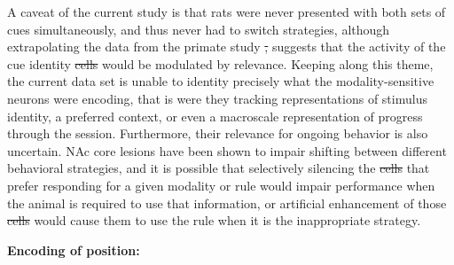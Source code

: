 \documentclass[11pt]{article}
\providecommand{\DIFadd}[1]{{\protect\color{blue}\uwave{#1}}} %
\providecommand{\DIFdel}[1]{{\protect\color{red}\sout{#1}}}                      %
\providecommand{\DIFaddbegin}{} %
\providecommand{\DIFaddend}{} %
\providecommand{\DIFdelbegin}{} %
\providecommand{\DIFdelend}{} %
\newcommand{\DIFscaledelfig}{0.5}
\newlength{\DIFdelgraphicswidth} %
\newlength{\DIFdelgraphicsheight} %
\newcommand{\DIFaddincludegraphics}[2][]{{\color{blue}\fbox{\DIFOincludegraphics[#1]{#2}}}} %
\newcommand{\DIFdelincludegraphics}[2][]{%
\sbox{\DIFdelgraphicsbox}{\DIFOincludegraphics[#1]{#2}}%
\settoboxwidth{\DIFdelgraphicswidth}{\DIFdelgraphicsbox} %
\settoboxtotalheight{\DIFdelgraphicsheight}{\DIFdelgraphicsbox} %
\scalebox{\DIFscaledelfig}{%
\parbox[b]{\DIFdelgraphicswidth}{\usebox{\DIFdelgraphicsbox}\\[-\baselineskip] \rule{\DIFdelgraphicswidth}{0em}}\llap{\resizebox{\DIFdelgraphicswidth}{\DIFdelgraphicsheight}{%
\setlength{\unitlength}{\DIFdelgraphicswidth}%
\begin{picture}(1,1)%
\thicklines\linethickness{2pt} %
{\color[rgb]{1,0,0}\put(0,0){\framebox(1,1){}}}%
{\color[rgb]{1,0,0}\put(0,0){\line( 1,1){1}}}%
{\color[rgb]{1,0,0}\put(0,1){\line(1,-1){1}}}%
\end{picture}%
}\hspace*{3pt}}} %
} %
\DeclareRobustCommand{\DIFaddbegin}{\DIFOaddbegin \let\includegraphics\DIFaddincludegraphics} %
\DeclareRobustCommand{\DIFaddend}{\DIFOaddend \let\includegraphics\DIFOincludegraphics} %
\DeclareRobustCommand{\DIFdelbegin}{\DIFOdelbegin \let\includegraphics\DIFdelincludegraphics} %
\DeclareRobustCommand{\DIFdelend}{\DIFOaddend \let\includegraphics\DIFOincludegraphics} %
\begin{document}
{A caveat of the current study is that rats were never presented with both sets of cues simultaneously, and thus never had to switch strategies, although extrapolating the data from the primate study \DIFdelbegin \DIFdel{, }\DIFdelend suggests that the activity of the cue identity \DIFdelbegin \DIFdel{cells }\DIFdelend \DIFaddbegin \DIFadd{units }\DIFaddend would be modulated by relevance. Keeping along this theme, the current data set is unable to identity precisely what the modality-sensitive neurons were encoding, that is were they tracking representations of stimulus identity, a preferred context, or even a macroscale representation of progress through the session. Furthermore, their relevance for ongoing behavior is also uncertain. NAc core lesions have been shown to impair shifting between different behavioral strategies, and it is possible that selectively silencing the \DIFdelbegin \DIFdel{cells }\DIFdelend \DIFaddbegin \DIFadd{units }\DIFaddend that prefer responding for a given modality or rule would impair performance when the animal is required to use that information, or artificial enhancement of those \DIFdelbegin \DIFdel{cells }\DIFdelend \DIFaddbegin \DIFadd{units }\DIFaddend would cause them to use the rule when it is the inappropriate strategy.

{\bf Encoding of position:}

}
\end{document}
